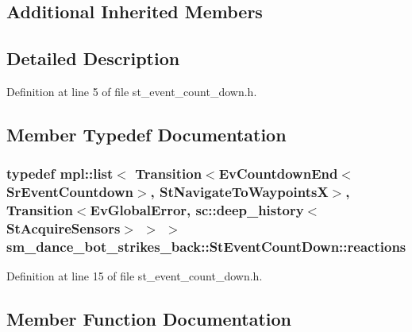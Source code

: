 \subsection*{Additional Inherited Members}


\subsection{Detailed Description}


Definition at line 5 of file st\+\_\+event\+\_\+count\+\_\+down.\+h.



\subsection{Member Typedef Documentation}
\subsubsection[{\texorpdfstring{reactions}{reactions}}]{\setlength{\rightskip}{0pt plus 5cm}typedef mpl\+::list$<$ Transition$<$Ev\+Countdown\+End$<$Sr\+Event\+Countdown$>$, {\bf St\+Navigate\+To\+WaypointsX}$>$, Transition$<${\bf Ev\+Global\+Error}, sc\+::deep\+\_\+history$<${\bf St\+Acquire\+Sensors}$>$ $>$ $>$ {\bf sm\+\_\+dance\+\_\+bot\+\_\+strikes\+\_\+back\+::\+St\+Event\+Count\+Down\+::reactions}}\hypertarget{structsm__dance__bot__strikes__back_1_1StEventCountDown_a727d864e6d375449a51fd8ea47810551}{}\label{structsm__dance__bot__strikes__back_1_1StEventCountDown_a727d864e6d375449a51fd8ea47810551}


Definition at line 15 of file st\+\_\+event\+\_\+count\+\_\+down.\+h.



\subsection{Member Function Documentation}
